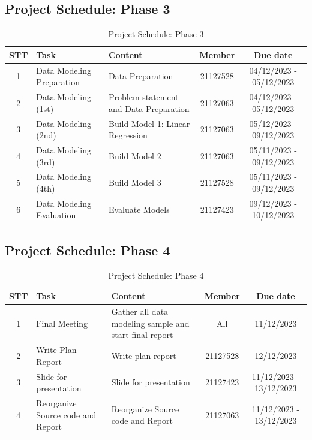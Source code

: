 \documentclass[13pt]{article}
\begin{document}
\subsection{Project Schedule: Phase 3}
\begin{table}[H]
    \centering
    \begin{tabular}{|c|p{4cm}|p{5cm}|c|c|}
    \hline
       \textbf{STT} & \textbf{Task} & \textbf{Content} & \textbf{Member} & \textbf{Due date}\\
    \hline
        1 & Data Modeling Preparation & Data Preparation & 21127528 & 04/12/2023 - 05/12/2023\\
    \hline
        2 & Data Modeling (1st) & Problem statement and Data Preparation & 21127063 & 04/12/2023 - 05/12/2023\\
    \hline
        3 & Data Modeling (2nd) & Build Model 1: Linear Regression & 21127063 & 05/12/2023 - 09/12/2023\\
    \hline
        4 & Data Modeling (3rd) & Build Model 2 & 21127063 & 05/11/2023 - 09/12/2023\\
    \hline
        5 & Data Modeling (4th) & Build Model 3 & 21127528 & 05/11/2023 - 09/12/2023\\
    \hline
        6 & Data Modeling Evaluation & Evaluate Models & 21127423 & 09/12/2023 - 10/12/2023\\
    \hline
    \end{tabular}
    \caption{Project Schedule: Phase 3}
    \label{tab:mytable}
\end{table}


\subsection{Project Schedule: Phase 4}
\begin{table}[h]
    \centering
    \begin{tabular}{|c|p{4cm}|p{5cm}|c|c|}
    \hline
       \textbf{STT} & \textbf{Task} & \textbf{Content} & \textbf{Member} & \textbf{Due date}\\
    \hline
        1 & Final Meeting & Gather all data modeling sample and start final report & All & 11/12/2023\\
    \hline
        2 & Write Plan Report & Write plan report & 21127528 & 12/12/2023\\
    \hline
        3 & Slide for presentation & Slide for presentation & 21127423 & 11/12/2023 - 13/12/2023\\
    \hline
        4 & Reorganize Source code and Report & Reorganize Source code and Report & 21127063 & 11/12/2023 - 13/12/2023\\
    \hline
    \end{tabular}
    \caption{Project Schedule: Phase 4}
    \label{tab:mytable}
\end{table}
\end{document}
